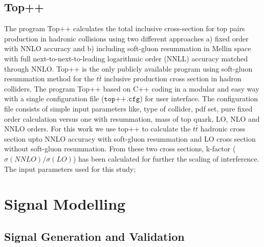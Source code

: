 \subsection{Top++}\label{subsec:top_pp}
The program Top++ \cite{Czakon:top_pp} calculates the total inclusive cross-section for top pairs production in hadronic collisions using two different approaches a) fixed order with NNLO accuracy and b) including soft-gluon resummation in Mellin space with full next-to-next-to-leading logarithmic order (NNLL) accuracy matched through NNLO. Top++ is the only publicly available program using soft-gluon resummation method for the $t\bar{t}$ inclusive production cross section in hadron colliders.
The program Top++ based on C++ coding in a modular and easy way with a single configuration file ($\texttt{top++.cfg}$) for user interface. The configuration file consists of simple input parameters like, type of collider, pdf set, pure fixed order calculation versus one with resummation, mass of top quark, LO, NLO and NNLO orders. For this work we use top++ to calculate the $t\bar{t}$ hadronic cross section upto NNLO accuracy with soft-gluon resummation and LO cross section without soft-gluon resummation. From these two cross sections, k-factor ($\sigma(NNLO)/\sigma(LO)$) has been calculated for further the scaling of interference. The input parameters used for this study;  


\section{Signal Modelling}\label{sec:signal}
\subsection{Signal Generation and Validation}

    




\clearpage{\pagestyle{empty}\cleardoublepage}
